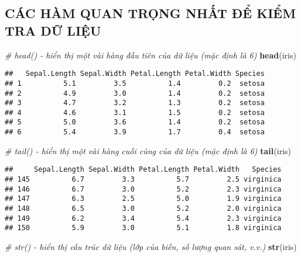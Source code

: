 \documentclass[
]{article}
\newenvironment{Shaded}{\begin{snugshade}}{\end{snugshade}}
\newcommand{\CommentTok}[1]{\textcolor[rgb]{0.56,0.35,0.01}{\textit{#1}}}
\newcommand{\FunctionTok}[1]{\textcolor[rgb]{0.13,0.29,0.53}{\textbf{#1}}}
\newcommand{\NormalTok}[1]{#1}
\begin{document}
\subsection{CÁC HÀM QUAN TRỌNG NHẤT ĐỂ KIỂM TRA DỮ
LIỆU}\label{cuxe1c-huxe0m-quan-trux1ecdng-nhux1ea5t-ux111ux1ec3-kiux1ec3m-tra-dux1eef-liux1ec7u}

\begin{Shaded}
\begin{Highlighting}[]
\CommentTok{\# head() {-} hiển thị một vài hàng đầu tiên của dữ liệu (mặc định là 6)}
\FunctionTok{head}\NormalTok{(iris)}
\end{Highlighting}
\end{Shaded}

\begin{verbatim}
##   Sepal.Length Sepal.Width Petal.Length Petal.Width Species
## 1          5.1         3.5          1.4         0.2  setosa
## 2          4.9         3.0          1.4         0.2  setosa
## 3          4.7         3.2          1.3         0.2  setosa
## 4          4.6         3.1          1.5         0.2  setosa
## 5          5.0         3.6          1.4         0.2  setosa
## 6          5.4         3.9          1.7         0.4  setosa
\end{verbatim}

\begin{Shaded}
\begin{Highlighting}[]
\CommentTok{\# tail() {-} hiển thị một vài hàng cuối cùng của dữ liệu (mặc định là 6)}
\FunctionTok{tail}\NormalTok{(iris)}
\end{Highlighting}
\end{Shaded}

\begin{verbatim}
##     Sepal.Length Sepal.Width Petal.Length Petal.Width   Species
## 145          6.7         3.3          5.7         2.5 virginica
## 146          6.7         3.0          5.2         2.3 virginica
## 147          6.3         2.5          5.0         1.9 virginica
## 148          6.5         3.0          5.2         2.0 virginica
## 149          6.2         3.4          5.4         2.3 virginica
## 150          5.9         3.0          5.1         1.8 virginica
\end{verbatim}

\begin{Shaded}
\begin{Highlighting}[]
\CommentTok{\# str() {-} hiển thị cấu trúc dữ liệu (lớp của biến, số lượng quan sát, v.v.)}
\FunctionTok{str}\NormalTok{(iris)}
\end{Highlighting}
\end{Shaded}
\end{document}
